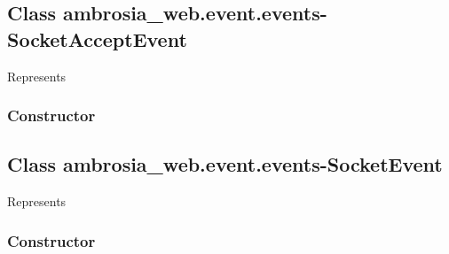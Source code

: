 \documentclass[letterpaper,10pt,english]{sphinxmanual}
\begin{document}
\subsection{Class ambrosia\_web.event.events-SocketAcceptEvent}
\label{ambrosia_web.event.events-SocketAcceptEvent::doc}\label{ambrosia_web.event.events-SocketAcceptEvent:class-ambrosia-web-event-events-socketacceptevent}
Represents {\hyperref[ambrosia_plugins.lkm:ambrosia_plugins.lkm.events.SocketAcceptEvent]{}}


\subsubsection{Constructor}
\label{ambrosia_web.event.events-SocketAcceptEvent:constructor}

\begin{fulllineitems}
\label{ambrosia_web.event.events-SocketAcceptEvent:ambrosia_web.event.events-SocketAcceptEvent}
\end{fulllineitems}



\subsection{Class ambrosia\_web.event.events-SocketEvent}
\label{ambrosia_web.event.events-SocketEvent:class-ambrosia-web-event-events-socketevent}\label{ambrosia_web.event.events-SocketEvent::doc}
Represents {\hyperref[ambrosia_plugins.lkm:ambrosia_plugins.lkm.events.SocketEvent]{}}


\subsubsection{Constructor}
\label{ambrosia_web.event.events-SocketEvent:constructor}

\begin{fulllineitems}
\label{ambrosia_web.event.events-SocketEvent:ambrosia_web.event.events-SocketEvent}
\end{fulllineitems}
\end{document}

